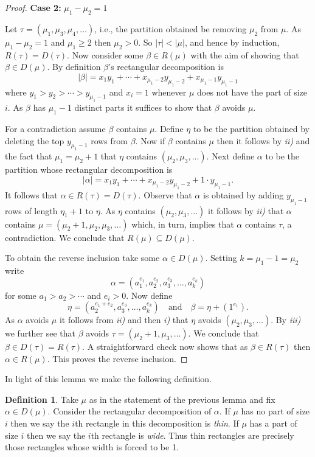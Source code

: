 \documentclass{article}
\theoremstyle{plain}
\theoremstyle{definition}
\newtheorem{definition}[theorem]{Definition}
\begin{document}
\begin{proof}
\medskip\noindent 
\textbf{Case 2:} $\mu_1-\mu_2 = 1$ 
\medskip

Let $\tau = (\mu_1, \mu_3,\mu_4,\ldots)$, i.e., the partition obtained be removing $\mu_2$ from $\mu$.    As $\mu_1-\mu_2 =1$ and $\mu_1\geq 2$ then $\mu_2>0$.  So $|\tau|< |\mu|$, and hence by induction, $R(\tau) = D(\tau)$.  Now consider some $\beta\in R(\mu)$ with the aim of showing that $\beta\in D(\mu)$.  By definition $\beta$'s rectangular decomposition is 
$$|\beta|=x_1y_1 + \cdots + x_{\mu_1-2}y_{\mu_1-2}+ x_{\mu_1-1} y_{\mu_1-1}$$
where $y_1>y_2>\cdots > y_{\mu_1-1}$ and $x_i=1$ whenever $\mu$ does not have the part of size $i$.  As $\beta$ has $\mu_1-1$ distinct parts it suffices to show that $\beta$ avoids $\mu$. 

For a contradiction assume $\beta$ contains $\mu$. Define $\eta $ to be the partition obtained by deleting the top $y_{\mu_1-1}$ rows from $\beta$.   Now if $\beta$ contains $\mu$ then it follows by \emph{ii)} and the fact that $\mu_1 = \mu_2+1$ that $\eta $ contains $(\mu_2,\mu_3,\ldots)$.  Next define $\alpha$ to be the partition whose rectangular decomposition is 
$$|\alpha|=x_1y_1 + \cdots + x_{\mu_1-2}y_{\mu_1-2} + 1\cdot y_{\mu_1-1}.$$
It follows that $\alpha \in R(\tau)=D(\tau)$.   Observe that $\alpha$ is obtained by adding $y_{\mu_1-1}$ rows of length $\eta _1+1$ to $\eta $.  As $\eta $ contains $(\mu_2,\mu_3,\ldots)$ it follows by \emph{ii)} that $\alpha$ contains $\mu=(\mu_2+1,\mu_2, \mu_3,\ldots)$ which, in turn, implies that $\alpha$ contains $\tau$, a contradiction.  We conclude that $R(\mu) \subseteq D(\mu)$.

To obtain the reverse inclusion take some $\alpha\in D(\mu)$.  Setting $k = \mu_1-1 = \mu_2$ write
$$\alpha = (a_1^{e_1}, a_2^{e_2},a_3^{e_3}, \ldots, a_{k}^{e_{k}})$$ 
for some $a_1>a_2>\cdots $ and $e_i>0$.  Now define
$$\eta  = (a_2^{e_1+e_2},a_3^{e_3},\ldots, a_k^{e_k})\quad\text{and}\quad  \beta = \eta  +(1^{e_1}).$$
As $\alpha$ avoids $\mu$ it follows from \emph{ii)} and then \emph{i)} that $\eta $ avoids $(\mu_2,\mu_3,\ldots)$.  By \emph{iii)} we further see that $\beta$ avoids $\tau = (\mu_2+1,\mu_3,\ldots)$.  We conclude that $\beta\in D(\tau) = R(\tau)$.  A straightforward check now shows that as $\beta\in R(\tau)$ then $\alpha\in R(\mu)$.  This proves the reverse inclusion.  
\end{proof}



In light of this lemma we make the following definition.  

\begin{definition}
Take $\mu$ as in the statement of the previous lemma and fix $\alpha\in D(\mu)$.  Consider the rectangular decomposition of $\alpha$.  If $\mu$ has no part of size $i$ then we say the $i$th rectangle in this decomposition is \emph{thin}.  If $\mu$ has a part of size $i$ then we say the $i$th rectangle is \emph{wide}. Thus thin rectangles are precisely those rectangles whose width is forced to be 1.  
\end{definition}
\end{document}
